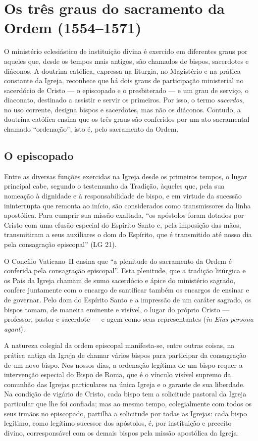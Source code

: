\section{Os três graus do sacramento da Ordem (1554--1571)}

O ministério eclesiástico de instituição divina é exercido em diferentes graus por aqueles que, desde os tempos mais antigos, são chamados de bispos, sacerdotes e diáconos. A doutrina católica, expressa na liturgia, no Magistério e na prática constante da Igreja, reconhece que há dois graus de participação ministerial no sacerdócio de Cristo --- o episcopado e o presbiterado --- e um grau de serviço, o diaconato, destinado a assistir e servir os primeiros. Por isso, o termo \textit{sacerdos}, no uso corrente, designa bispos e sacerdotes, mas não os diáconos. Contudo, a doutrina católica ensina que os três graus são conferidos por um ato sacramental chamado ``ordenação'', isto é, pelo sacramento da Ordem.

\subsection*{O episcopado}

Entre as diversas funções exercidas na Igreja desde os primeiros tempos, o lugar principal cabe, segundo o testemunho da Tradição, àqueles que, pela sua nomeação à dignidade e à responsabilidade de bispo, e em virtude da sucessão ininterrupta que remonta ao início, são considerados como transmissores da linha apostólica. Para cumprir sua missão exaltada, ``os apóstolos foram dotados por Cristo com uma efusão especial do Espírito Santo e, pela imposição das mãos, transmitiram a seus auxiliares o dom do Espírito, que é transmitido até nosso dia pela consagração episcopal'' (LG 21).

O Concílio Vaticano~II ensina que ``a plenitude do sacramento da Ordem é conferida pela consagração episcopal''. Esta plenitude, que a tradição litúrgica e os Pais da Igreja chamam de sumo sacerdócio e ápice do ministério sagrado, confere juntamente com o encargo de santificar também os encargos de ensinar e de governar. Pelo dom do Espírito Santo e a impressão de um caráter sagrado, os bispos tomam, de maneira eminente e visível, o lugar do próprio Cristo --- professor, pastor e sacerdote --- e agem como seus representantes (\textit{in Eius persona agant}).

A natureza colegial da ordem episcopal manifesta-se, entre outras coisas, na prática antiga da Igreja de chamar vários bispos para participar da consagração de um novo bispo. Nos nossos dias, a ordenação legítima de um bispo requer a intervenção especial do Bispo de Roma, que é o vínculo visível supremo da comunhão das Igrejas particulares na única Igreja e o garante de sua liberdade. Na condição de vigário de Cristo, cada bispo tem a solicitude pastoral da Igreja particular que lhe foi confiada; mas ao mesmo tempo, colegialmente com todos os seus irmãos no episcopado, partilha a solicitude por todas as Igrejas: cada bispo legítimo, como legítimo sucessor dos apóstolos, é, por instituição e preceito divino, corresponsável com os demais bispos pela missão apostólica da Igreja.

